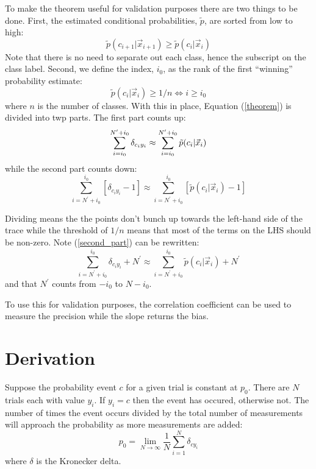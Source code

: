 \documentclass{article}
\begin{document}
To make the theorem useful for validation purposes there are two things 
to be done.
First, the estimated conditional probabilities, $\tilde p$, are sorted from
low to high:
\begin{equation}
	\tilde p(c_{i+1}|\vec x_{i+1}) \ge \tilde p(c_i|\vec x_i)
\end{equation}
Note that there is no need to separate out each class, hence the subscript
on the class label.
Second, we define the index, $i_0$, as the rank of the first ``winning''
probability estimate:
\begin{equation}
	\tilde p(c_i | \vec x_i) \ge 1/n \iff i \ge i_0
\end{equation}
where $n$ is the number of classes.
With this in place, Equation (\ref{theorem}) is divided into twp parts.
The first part counts up:
\begin{equation}
	\sum_{i=i_0}^{N^\prime+i_0} \delta_{c_iy_i} 
		\approx \sum_{i=i_0}^{N^\prime+i_0} \tilde p(c_i | \vec x_i) \\
\end{equation}
while the second part counts down:
\begin{equation}
	\sum_{i=N^\prime+i_0}^{i_0} \left [\delta_{c_iy_i}-1 \right ] 
	\approx \sum_{i=N^\prime+i_0}^{i_0} \left [\tilde p(c_i | \vec x_i) - 1 \right ]
	\label{second_part}
\end{equation}

Dividing means the the points don't bunch up towards the left-hand side of
the trace while the
threshold of $1/n$ means that most of the terms on the LHS should be non-zero.
Note (\ref{second_part}) can be rewritten:
\begin{equation}
	\sum_{i=N^\prime+i_0}^{i_0} \delta_{c_iy_i} + N^\prime
	\approx \sum_{i=N^\prime+i_0}^{i_0} \tilde p(c_i | \vec x_i) + N^\prime
\end{equation}
and that $N^\prime$ counts from $-i_0$ to $N-i_0$.

To use this for validation purposes,
the correlation coefficient can be used to measure the precision while the 
slope returns the bias.


\section{Derivation}

Suppose the probability event $c$ for a given trial is constant at $p_0$.
There are $N$ trials each with value $y_i$. 
If $y_i=c$ then the event has occured, otherwise not.
The number of times the event occurs divided by the total number of
measurements will approach the probability as more measurements are added:
\begin{equation}
p_0 = \lim_{N \rightarrow \infty} \frac{1}{N}\sum_{i=1}^N \delta_{cy_i}
\end{equation}
where $\delta$ is the Kronecker delta.
\end{document}
